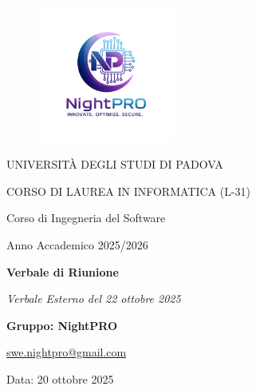 \documentclass[a4paper, 11pt, oneside]{scrartcl} %
\begin{document}
\thispagestyle{empty}
\begin{titlepage}
    \centering
    
\begin{figure}
    \centering
    \includegraphics[width=0.4\textwidth]{logo.jpg}
\end{figure}

    \vfill
    
    {\small UNIVERSITÀ DEGLI STUDI DI PADOVA \par}
    {\small CORSO DI LAUREA IN INFORMATICA (L-31) \par}
    \vspace{0.5cm}
    {\large Corso di Ingegneria del Software \par}
    {\small Anno Accademico 2025/2026 \par}


    
    \vfill
    
    {\Huge \bfseries Verbale di Riunione \par}
    
    \vspace{1cm}
    
    {\Large \itshape Verbale Esterno del 22 ottobre 2025 \par} 
    
    \vfill
    
    {\Large \bfseries Gruppo: NightPRO \par}
    \vspace{0.5cm}
    {\large \href{mailto:swe.nightpro@gmail.com}{swe.nightpro@gmail.com} \par}
    
    \vfill
    
    {\large Data: 20 ottobre 2025 \par}

\end{titlepage}
\end{document}
